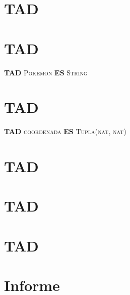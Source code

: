 \documentclass[10pt, a4paper]{article}
\begin{document}
\maketitle

\thispagestyle{fancy}
\tableofcontents

\pagebreak

\section{TAD }


\section{TAD }

\textbf{TAD} \textsc{Pokemon} \textbf{ES} \textsc{String}

\section{TAD }

\textbf{TAD} \textsc{coordenada} \textbf{ES} \textsc{Tupla(nat, nat)}


\newpage


\section{TAD }



%

\newpage
\section{TAD }




\newpage
\section{TAD }



\newpage
\section{Informe}


\end{document}
